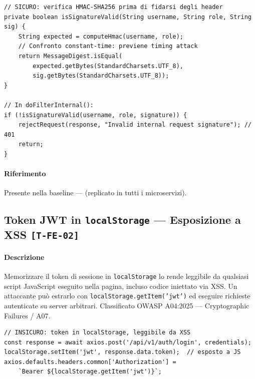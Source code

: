 ﻿\documentclass[a4paper,12pt]{report}
\newcommand{\threat}[1]{\texttt{\small\textcolor{vulnred}{[#1]}}}
\begin{document}
\begin{securebox}[title={Codice Sicuro --- InternalAuthFilter.java (tutti i servizi)}]
\begin{lstlisting}[style=java]
// SICURO: verifica HMAC-SHA256 prima di fidarsi degli header
private boolean isSignatureValid(String username, String role, String sig) {
    String expected = computeHmac(username, role);
    // Confronto constant-time: previene timing attack
    return MessageDigest.isEqual(
        expected.getBytes(StandardCharsets.UTF_8),
        sig.getBytes(StandardCharsets.UTF_8));
}

// In doFilterInternal():
if (!isSignatureValid(username, role, signature)) {
    rejectRequest(response, "Invalid internal request signature"); // 401
    return;
}
\end{lstlisting}
\end{securebox}

\paragraph{Riferimento} Presente nella baseline --- 
(replicato in tutti i microservizi).

\subsection{Token JWT in \texttt{localStorage} --- Esposizione a XSS \threat{T-FE-02}}

\paragraph{Descrizione}
Memorizzare il token di sessione in \texttt{localStorage} lo rende leggibile da qualsiasi
script JavaScript eseguito nella pagina, incluso codice iniettato via XSS. Un attaccante
può estrarlo con \texttt{localStorage.getItem('jwt')} ed eseguire richieste autenticate
su server arbitrari. Classificato OWASP A04:2025 --- Cryptographic Failures / A07.

\begin{insecurebox}[title={Pattern Vulnerabile Evitato --- gestione token frontend}]
\begin{lstlisting}[style=typescript]
// INSICURO: token in localStorage, leggibile da XSS
const response = await axios.post('/api/v1/auth/login', credentials);
localStorage.setItem('jwt', response.data.token);  // esposto a JS
axios.defaults.headers.common['Authorization'] =
    `Bearer ${localStorage.getItem('jwt')}`;
\end{lstlisting}
\end{insecurebox}
\end{document}
